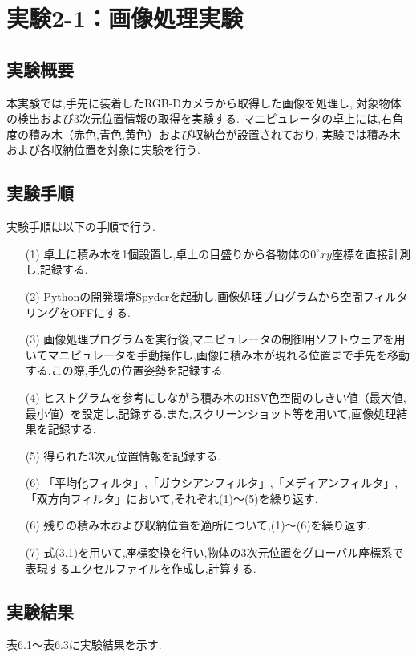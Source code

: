 
\section{実験2-1：画像処理実験}

\subsection{実験概要}
本実験では,手先に装着したRGB-Dカメラから取得した画像を処理し,
対象物体の検出および3次元位置情報の取得を実験する.
マニピュレータの卓上には,右角度の積み木（赤色,青色,黄色）および収納台が設置されており,
実験では積み木および各収納位置を対象に実験を行う.

\subsection{実験手順}
実験手順は以下の手順で行う.

\begin{enumerate}
  \item[(1)] 卓上に積み木を1個設置し,卓上の目盛りから各物体の$0^{\circ}xy$座標を直接計測し,記録する.
  \item[(2)] Pythonの開発環境Spyderを起動し,画像処理プログラムから空間フィルタリングをOFFにする.
  \item[(3)] 画像処理プログラムを実行後,マニピュレータの制御用ソフトウェアを用いてマニピュレータを手動操作し,画像に積み木が現れる位置まで手先を移動する.この際,手先の位置姿勢を記録する.
  \item[(4)] ヒストグラムを参考にしながら積み木のHSV色空間のしきい値（最大値,最小値）を設定し,記録する.また,スクリーンショット等を用いて,画像処理結果を記録する.
  \item[(5)] 得られた3次元位置情報を記録する.
  \item[(6)] 「平均化フィルタ」,「ガウシアンフィルタ」,「メディアンフィルタ」,「双方向フィルタ」において,それぞれ(1)～(5)を繰り返す.
  \item[(6)] 残りの積み木および収納位置を適所について,(1)～(6)を繰り返す.
  \item[(7)] 式(3.1)を用いて,座標変換を行い,物体の3次元位置をグローバル座標系で表現するエクセルファイルを作成し,計算する.
\end{enumerate}

\subsection{実験結果}
表6.1～表6.3に実験結果を示す.

